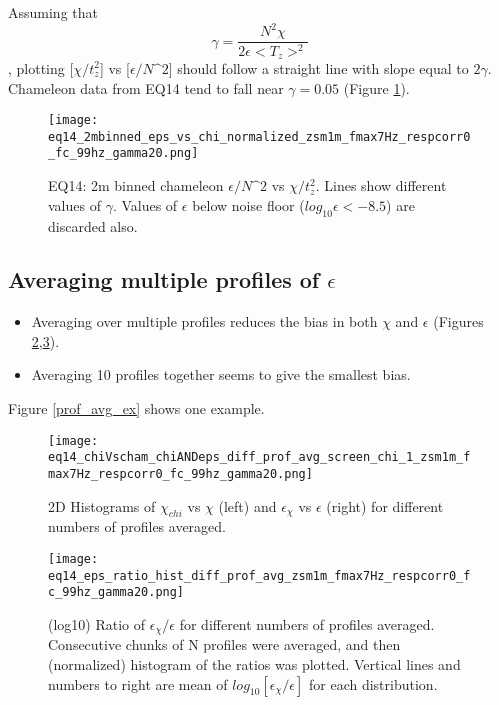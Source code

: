 \documentclass[11pt]{article}
\begin{document}
Assuming that
\begin{equation}
\gamma=\frac{N^2 \chi}{2\epsilon<T_z>^2}
\end{equation}
, plotting [$\chi/t_{z}^{2}$] vs [$\epsilon/N\^2$] should follow a straight line with slope equal to $2\gamma$. Chameleon data from EQ14 tend to fall near $\gamma=0.05$ (Figure \ref{chiepsnorm}).


\begin{figure}[htbp]
\texttt{[image: eq14\_2mbinned\_eps\_vs\_chi\_normalized\_zsm1m\_fmax7Hz\_respcorr0\_fc\_99hz\_gamma20.png]}
\caption{EQ14: 2m binned  chameleon $\epsilon/N\^2$ vs $\chi/t_{z}^{2}$. Lines show different values of $\gamma$. Values of $\epsilon$ below noise floor ($log_{10}\epsilon<-8.5$) are discarded also.}
\label{chiepsnorm}
\end{figure}






\clearpage
\subsection{Averaging multiple profiles of $\epsilon$}


\begin{itemize}

\item Averaging over multiple profiles reduces the bias in both $\chi$ and $\epsilon$ (Figures \ref{2Dhistdiffprof},\ref{histdiffprof}).

\item Averaging 10 profiles together seems to give the smallest bias.

\end{itemize}


Figure \ref{prof_avg_ex} shows one example. 


\begin{figure}[htbp]
\texttt{[image: eq14\_chiVscham\_chiANDeps\_diff\_prof\_avg\_screen\_chi\_1\_zsm1m\_fmax7Hz\_respcorr0\_fc\_99hz\_gamma20.png]}
\caption{2D Histograms of $\chi_{chi}$ vs $\chi$ (left) and $\epsilon_{\chi}$ vs $\epsilon$ (right) for different numbers of profiles averaged. }
\label{2Dhistdiffprof}
\end{figure}


\begin{figure}[htbp]
\texttt{[image: eq14\_eps\_ratio\_hist\_diff\_prof\_avg\_zsm1m\_fmax7Hz\_respcorr0\_fc\_99hz\_gamma20.png]}
\caption{(log10) Ratio of $\epsilon_{\chi}/\epsilon$ for different numbers of profiles averaged. Consecutive chunks of N profiles were averaged, and then (normalized) histogram of the ratios was plotted. Vertical lines and numbers to right are mean of $log_{10}[\epsilon_{\chi}/\epsilon]$ for each distribution. }
\label{histdiffprof}
\end{figure}
\end{document}
